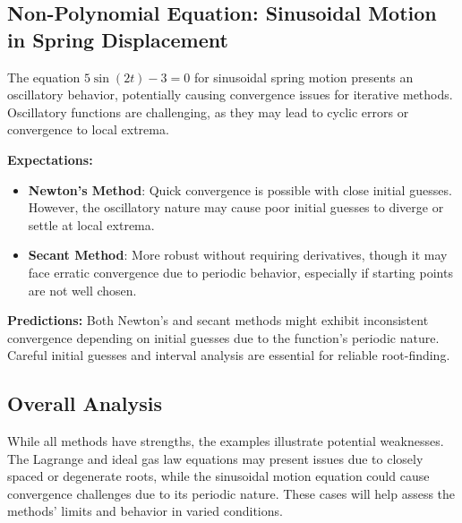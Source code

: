 \documentclass[12pt]{article}
\begin{document}
\subsection*{Non-Polynomial Equation: Sinusoidal Motion in Spring Displacement}

The equation \( 5 \sin(2t) - 3 = 0 \) for sinusoidal spring motion presents an oscillatory behavior, potentially causing convergence issues for iterative methods. Oscillatory functions are challenging, as they may lead to cyclic errors or convergence to local extrema.

\noindent \textbf{Expectations:}
\begin{itemize}
    \item \textbf{Newton’s Method}: Quick convergence is possible with close initial guesses. However, the oscillatory nature may cause poor initial guesses to diverge or settle at local extrema.
    \item \textbf{Secant Method}: More robust without requiring derivatives, though it may face erratic convergence due to periodic behavior, especially if starting points are not well chosen.
\end{itemize}

\noindent \textbf{Predictions:}  
Both Newton’s and secant methods might exhibit inconsistent convergence depending on initial guesses due to the function’s periodic nature. Careful initial guesses and interval analysis are essential for reliable root-finding.

\subsection*{Overall Analysis}

While all methods have strengths, the examples illustrate potential weaknesses. The Lagrange and ideal gas law equations may present issues due to closely spaced or degenerate roots, while the sinusoidal motion equation could cause convergence challenges due to its periodic nature. These cases will help assess the methods’ limits and behavior in varied conditions.
\end{document}
